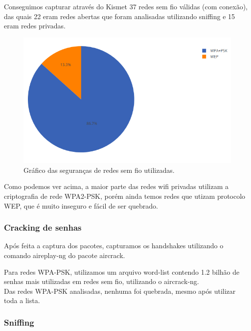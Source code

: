 \documentclass[
	article,			%
	12pt,				%
	oneside,			%
	a4paper,			%
	english,			%
	brazil,				%
	sumario=tradicional
	]{abntex2}
\begin{document}
Conseguimos capturar através do Kismet 37 redes sem fio válidas (com conexão), das quais 22 eram redes abertas que foram analisadas utilizando sniffing e 15 eram redes privadas.

\begin{figure}[H]
	\centering
	\caption{Gráfico das seguranças de redes sem fio utilizadas.}
	\includegraphics[scale=0.7]{graficopie-seguranca-redes}
\end{figure}

Como podemos ver acima, a maior parte das redes wifi privadas utilizam a criptografia de rede WPA2-PSK, porém ainda temos redes que utizam protocolo WEP, que é muito inseguro e fácil de ser quebrado.

\subsubsection{Cracking de senhas}

Após feita a captura dos pacotes, capturamos os handshakes utilizando o comando aireplay-ng do pacote aircrack.\\


Para redes WPA-PSK, utilizamos um arquivo word-list contendo 1.2 bilhão de senhas mais utilizadas em redes sem fio, utilizando o aircrack-ng.\\

Das redes WPA-PSK analisadas, nenhuma foi quebrada, mesmo após utilizar toda a lista.


\subsubsection{Sniffing}
\end{document}
